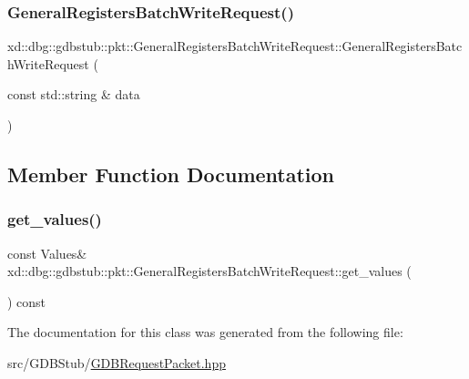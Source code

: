 \subsubsection{\texorpdfstring{General\+Registers\+Batch\+Write\+Request()}{GeneralRegistersBatchWriteRequest()}}
{\footnotesize\ttfamily xd\+::dbg\+::gdbstub\+::pkt\+::\+General\+Registers\+Batch\+Write\+Request\+::\+General\+Registers\+Batch\+Write\+Request (\begin{DoxyParamCaption}\item[{const std\+::string \&}]{data }\end{DoxyParamCaption})\hspace{0.3cm}{\ttfamily [inline]}}



\subsection{Member Function Documentation}
\mbox{\label{classxd_1_1dbg_1_1gdbstub_1_1pkt_1_1_general_registers_batch_write_request_adb4533712ca08db799da6bf98e215ebf}} 
\subsubsection{\texorpdfstring{get\+\_\+values()}{get\_values()}}
{\footnotesize\ttfamily const Values\& xd\+::dbg\+::gdbstub\+::pkt\+::\+General\+Registers\+Batch\+Write\+Request\+::get\+\_\+values (\begin{DoxyParamCaption}{ }\end{DoxyParamCaption}) const\hspace{0.3cm}{\ttfamily [inline]}}



The documentation for this class was generated from the following file\+:\begin{DoxyCompactItemize}
\item 
src/\+G\+D\+B\+Stub/\mbox{\hyperlink{_g_d_b_request_packet_8hpp}{G\+D\+B\+Request\+Packet.\+hpp}}\end{DoxyCompactItemize}
